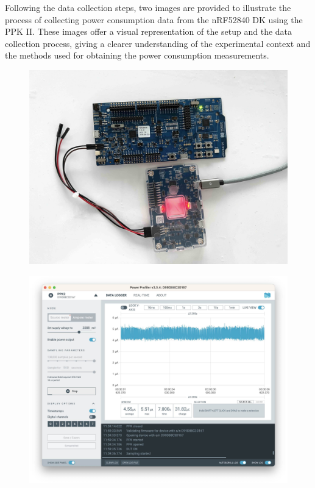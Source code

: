 Following the data collection steps, two images are provided to illustrate the process of collecting power consumption data from the \gls{nRF}52840 \gls{DK} using the \gls{PPK} II. These images offer a visual representation of the setup and the data collection process, giving a clearer understanding of the experimental context and the methods used for obtaining the power consumption measurements.

\begin{figure}[H]
    \centering
    \begin{minipage}[t]{0.45\textwidth}
        \centering
        \includegraphics[width=1\linewidth]{images/research_design/PPK2_Router.jpg}
        \label{fig:router_source_meter}
    \end{minipage}\hfill
    \begin{minipage}[t]{0.45\textwidth}
        \centering
        \includegraphics[width=1\linewidth]{images/research_design/PPK2_SDK.jpg}
        \label{fig:ppk2_source_meter}
    \end{minipage}
\end{figure}

